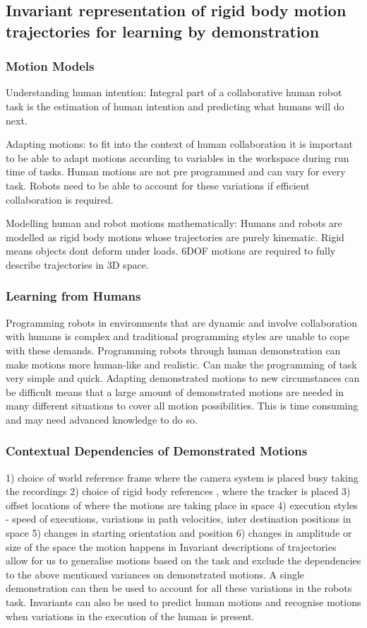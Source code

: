 \documentclass{article}
\begin{document}
\subsection{Invariant representation of rigid body motion trajectories for learning by demonstration}
\subsubsection{Motion Models}
Understanding human intention: 
Integral part of a collaborative human robot task is the estimation of human intention and predicting what humans will do next. 

Adapting motions:
to fit into the context of human collaboration it is important to be able to adapt motions according to variables in the workspace during run time of tasks. 
Human motions are not pre programmed and can vary for every task.
Robots need to be able to account for these variations if efficient collaboration is required. 

Modelling human and robot motions mathematically: 
Humans and robots are modelled as rigid body motions whose trajectories are purely kinematic. 
Rigid means objects dont deform under loads.
6DOF motions are required to fully describe trajectories in 3D space.

\subsubsection{Learning from Humans}
Programming robots in environments that are dynamic and involve collaboration with humans is complex and traditional programming styles are unable to cope with these demands. 
Programming robots through human demonstration can make motions more human-like and realistic. 
Can make the programming of task very simple and quick. 
Adapting demonstrated motions to new circumstances can be difficult means that a large amount of demonstrated motions are needed in many different situations to cover all motion possibilities. 
This is time consuming and may need advanced knowledge to do so. 

\subsubsection{Contextual Dependencies of Demonstrated Motions}
1) choice of world reference frame where the camera system is placed busy taking the recordings
2) choice of rigid body references , where the tracker is placed 
3) offset locations of where the motions are taking place in space 
4) execution styles
    - speed of executions, variations in path velocities, inter destination positions in space
5) changes in starting orientation and position
6) changes in amplitude or size of the space the motion happens in 
Invariant descriptions of trajectories allow for us to generalise motions based on the task and exclude the dependencies to the above mentioned variances on demonstrated motions. 
A single demonstration can then be used to account for all these variations in the robots task.
Invariants can also be used to predict human motions and recognise motions when variations in the execution of the human is present. 
\end{document}
